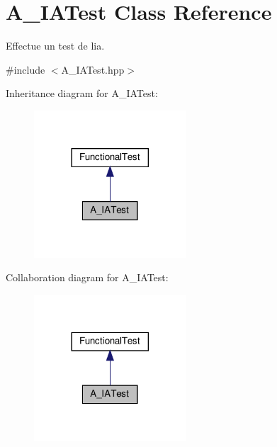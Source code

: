 \hypertarget{classA__IATest}{}\section{A\+\_\+\+I\+A\+Test Class Reference}
\label{classA__IATest}


Effectue un test de l\textquotesingle{}ia.  




{\ttfamily \#include $<$A\+\_\+\+I\+A\+Test.\+hpp$>$}



Inheritance diagram for A\+\_\+\+I\+A\+Test\+:
\nopagebreak
\begin{figure}[H]
\begin{center}
\leavevmode
\includegraphics[width=161pt]{classA__IATest__inherit__graph}
\end{center}
\end{figure}


Collaboration diagram for A\+\_\+\+I\+A\+Test\+:
\nopagebreak
\begin{figure}[H]
\begin{center}
\leavevmode
\includegraphics[width=161pt]{classA__IATest__coll__graph}
\end{center}
\end{figure}

